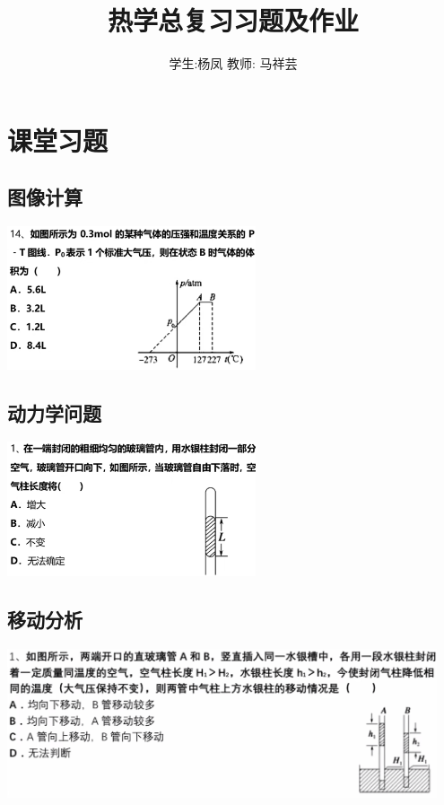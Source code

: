 \documentclass{article}
\title{热学总复习习题及作业}
\author{学生:杨凤 \quad 教师: 马祥芸}
\begin{document}
\maketitle
\tableofcontents
\newpage

\section{课堂习题}

\subsection{图像计算}
\includegraphics[width=0.55\textwidth,keepaspectratio]{./pictures/2.3-3.png}

\vspace{2em}

\subsection{动力学问题}
\includegraphics[width=0.55\textwidth,keepaspectratio]{./pictures/2.3-4.png}

\vspace{2em}

\subsection{移动分析}
\includegraphics[width=0.95\textwidth,keepaspectratio]{./pictures/2.3-7.png}
\end{document}
